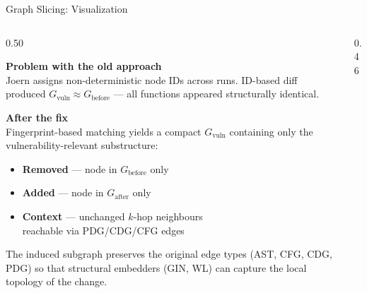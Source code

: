 \documentclass[aspectratio=169,10pt]{beamer}
\begin{document}
\begin{frame}{Graph Slicing: Visualization}
\begin{columns}[T]
\begin{column}{0.50\textwidth}

  \textbf{Problem with the old approach}\\[3pt]
  Joern assigns non-deterministic node IDs across runs.
  ID-based diff produced $G_{\text{vuln}} \approx G_{\text{before}}$ —
  all functions appeared structurally identical.

  \vspace{0.9em}
  \textbf{After the fix}\\[3pt]
  Fingerprint-based matching yields a compact $G_{\text{vuln}}$
  containing only the vulnerability-relevant substructure:
  \begin{itemize}
    \item \textcolor{miss}{\textbf{Removed}} — node in $G_{\text{before}}$ only
    \item \textcolor{hit}{\textbf{Added}} — node in $G_{\text{after}}$ only
    \item \textcolor{warn!90!black}{\textbf{Context}} — unchanged $k$-hop neighbours\\
          reachable via PDG/CDG/CFG edges
  \end{itemize}

  \vspace{0.6em}
  {\scriptsize\color{black!55}
  The induced subgraph preserves the original edge types
  (AST, CFG, CDG, PDG) so that structural embedders (GIN, WL)
  can capture the local topology of the change.}

\end{column}
\begin{column}{0.46\textwidth}
  \centering
\end{column}
\end{columns}
\end{frame}
\end{document}
